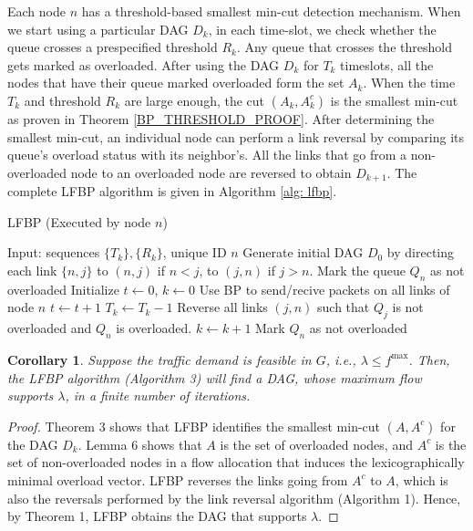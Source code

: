 \documentclass{sig-alternate-2013}
\newtheorem{corollary}{Corollary}
\begin{document}
 Each node $n$ has a threshold-based smallest min-cut detection mechanism.
When we start using a particular DAG $D_k$, in each time-slot, we check whether the queue crosses a prespecified threshold $R_k$. Any queue that crosses the threshold gets marked as overloaded. After using the DAG $D_k$ for $T_k$ timeslots, all the nodes that have their queue marked overloaded form the set $A_k$. When the time $T_k$ and threshold $R_k$ are large enough, the cut $(A_k,A_k^c)$ is the smallest min-cut as proven in Theorem \ref{BP_THRESHOLD_PROOF}. After determining the smallest min-cut, an individual node can perform a link reversal by comparing its queue's overload status with its neighbor's. All the links that go from a non-overloaded node to an overloaded node are reversed to obtain  $D_{k+1}$. The complete LFBP algorithm is given in Algorithm \ref{alg: lfbp}.

\begin{algorithm}[h] 
\caption{LFBP (Executed by node $n$)}
\label{alg: lfbp}
\begin{algorithmic}[1]
\State Input: sequences $\{T_k\}, \{R_k\}$, unique ID $n$
\State Generate initial DAG $D_0$ by directing each link $\{n,j\}$ to $(n,j)$ if $n<j$, to $(j,n)$ if $j>n$.
\State Mark the queue $Q_n$ as not overloaded
\State Initialize $t \gets 0$, $k \gets 0$
	\State Use BP to send/recive packets on all links of node $n$
	  \EndIf
	\State $t \gets t+1$
\State	
	\State $T_k \gets T_k-1$
		\State Reverse all links $(j,n)$ such that $Q_j$ is not overloaded and $Q_n$ is overloaded.
		\State $k\gets k+1$
		\State Mark $Q_n$ as not overloaded
	\EndIf
	
\EndWhile
\end{algorithmic}
\end{algorithm}

\begin{corollary}
Suppose the traffic demand is feasible in $G$, i.e., $\lambda\leq f^{\max}$. Then, the LFBP algorithm (Algorithm 3) will find a DAG, whose maximum flow supports $\lambda$, in a finite number of iterations.
\end{corollary}
\begin{proof}
Theorem 3 shows that LFBP identifies the smallest min-cut $(A,A^c)$ for the DAG $D_k$. Lemma 6 shows that $A$ is the set of overloaded nodes, and $A^c$ is the set of non-overloaded nodes in a flow allocation that induces the lexicographically minimal overload vector. LFBP reverses the links going from $A^c$ to $A$, which is also the reversals performed by the link reversal algorithm (Algorithm 1). Hence, by Theorem 1, LFBP obtains the DAG that supports $\lambda$.
\end{proof}
\end{document}
